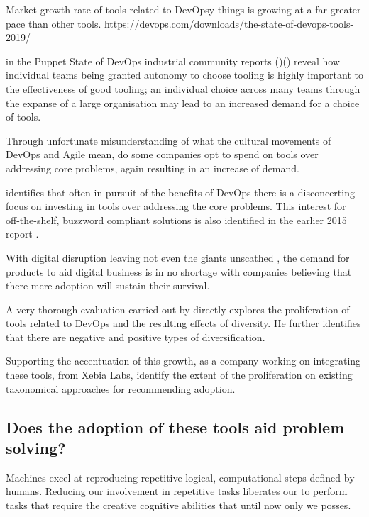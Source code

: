 Market growth rate of tools related to DevOpsy things is growing at a far greater pace than other tools. https://devops.com/downloads/the-state-of-devops-tools-2019/

\citeauthor{sodrPuppet2017} in the Puppet State of DevOps industrial community reports ()() reveal how individual teams being granted autonomy to choose tooling is highly important to the effectiveness of good tooling; an individual choice across many teams through the expanse of a large organisation may lead to an increased demand for a choice of tools.

Through unfortunate misunderstanding of what the cultural movements of DevOps and Agile mean, do some companies opt to spend on tools over addressing core problems, again resulting in an increase of demand.

\cite{sodrAccelerate2018} identifies that often in pursuit of the benefits of DevOps there is a disconcerting focus on investing in tools over addressing the core problems. This interest for off-the-shelf, buzzword compliant solutions is also identified in the earlier 2015 report \parencite{sodrPuppet2015}.

With digital disruption leaving not even the giants unscathed \parencite{weForum2016}, the demand for products to aid digital business is in no shortage with companies believing that there mere adoption will sustain their survival.

A very thorough evaluation carried out by \cite{kersten2018cambrian} directly explores the proliferation of tools related to DevOps and the resulting effects of diversity. He further identifies that there are negative and positive types of diversification.

Supporting the accentuation of this growth, as a company working on integrating these tools, \cite{xebiaLabs2019DevOpsReflections} from Xebia Labs, identify the extent of the proliferation on existing taxonomical approaches for recommending adoption.

\subsection{Does the adoption of these tools aid problem solving?}


Machines excel at reproducing repetitive logical, computational steps defined by humans. Reducing our involvement in repetitive tasks liberates our to perform tasks that require the creative cognitive abilities that until now only we posses.  

